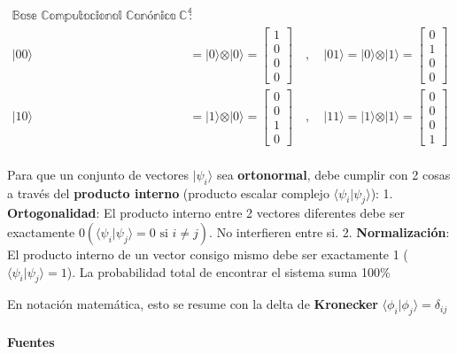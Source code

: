 \documentclass[11pt]{article}
\begin{document}
    $\displaystyle 
\begin{aligned}
\mathbb{\text{Base Computacional Canónica de } \mathbb{C}^4 } &:\\
\vert{00}\rangle &= \vert{0}\rangle \otimes \vert{0}\rangle = \begin{bmatrix} 1 \\ 0 \\ 0 \\ 0 \end{bmatrix} \quad , \quad \vert{01}\rangle = \vert{0}\rangle \otimes \vert{1}\rangle = \begin{bmatrix} 0 \\ 1 \\ 0 \\ 0 \end{bmatrix} \\[1em]
\vert{10}\rangle &= \vert{1}\rangle \otimes \vert{0}\rangle = \begin{bmatrix} 0 \\ 0 \\ 1 \\ 0 \end{bmatrix} \quad , \quad \vert{11}\rangle = \vert{1}\rangle \otimes \vert{1}\rangle = \begin{bmatrix} 0 \\ 0 \\ 0 \\ 1 \end{bmatrix} \\
\end{aligned}
$

    
    Para que un conjunto de vectores \(\vert{}\psi_i\rangle\) sea
\textbf{ortonormal}, debe cumplir con 2 cosas a través del
\textbf{producto interno} (producto escalar complejo
\(\langle\psi_i\vert{\psi_j}\rangle\)): 1. \textbf{Ortogonalidad}: El
producto interno entre 2 vectores diferentes debe ser exactamente
\(0(\langle\psi_i\vert{\psi_j}\rangle = 0 \text{ si } i \neq j )\). No
interfieren entre si. 2. \textbf{Normalización}: El producto interno de
un vector consigo mismo debe ser exactamente 1
(\(\langle\psi_i\vert{\psi_j\rangle} = 1\)). La probabilidad total de
encontrar el sistema suma 100\%

En notación matemática, esto se resume con la delta de
\textbf{Kronecker}
\(\langle \phi_i \vert{\phi_j} \rangle = \delta_{ij}\)

\paragraph{Fuentes}\label{fuentes}
\end{document}

